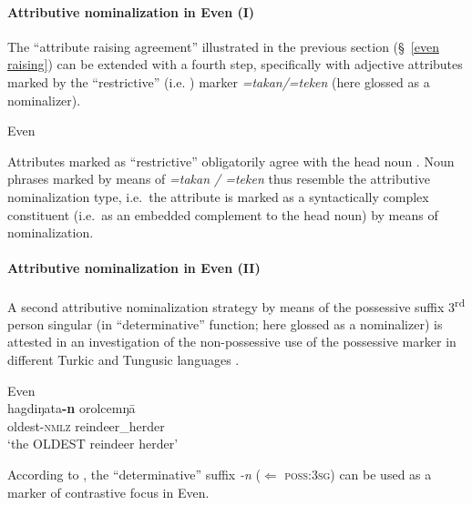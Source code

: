 \paragraph*{Attributive nominalization in Even (I)}
The “attribute raising agreement” illustrated in the previous section (\S~\ref{even raising}) can be extended with a fourth step, specifically with adjective attributes marked by the “restrictive” (i.e. ) marker \textit{=takan/=teken} (here glossed as a nominalizer).%
\begin{exe}
\ex 
\rm{Even \citep[32]{malchukov1995}}
\begin{xlist}
\end{xlist}
\end{exe}
Attributes marked as “restrictive” obligatorily agree with the head noun \cite[32]{malchukov1995}. Noun phrases marked by means of \textit{=takan / =teken} thus resemble the attributive nominalization type, i.e.~the attribute is marked as a syntactically complex constituent (i.e.~as an embedded complement to the head noun) by means of nominalization.

\paragraph*{Attributive nominalization in Even (II)}
A second attributive nominalization strategy by means of the possessive suffix 3\textsuperscript{rd} person singular (in “determinative” function; here glossed as a nominalizer) is attested in an investigation of the non-possessive use of the possessive marker in different Turkic and Tungusic languages \citep{benzing1993b}.
\begin{exe}
\ex 
\rm{Even \citep[17–18 Footnote 58]{benzing1993b}}\\
\gll	hagdiŋata\textbf{-n} orolcemŋā\\
	oldest-\textsc{nmlz} reindeer\_herder\\
\glt	‘the OLDEST reindeer herder’
\end{exe}
According to \cite[17–18 Footnote 58]{benzing1993b}, the “determinative” suffix \textit{-n} ($\Leftarrow$ \textsc{poss:3sg}) can be used as a marker of contrastive focus in Even.

